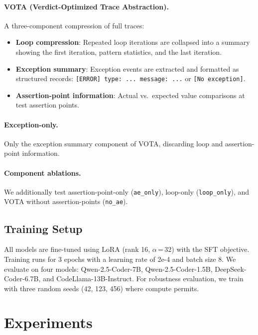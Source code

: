 \documentclass[11pt]{article}
\begin{document}
\paragraph{VOTA (Verdict-Optimized Trace Abstraction).} A three-component compression of full traces:
\begin{itemize}[nosep,leftmargin=*]
    \item \textbf{Loop compression}: Repeated loop iterations are collapsed into a summary showing the first iteration, pattern statistics, and the last iteration.
    \item \textbf{Exception summary}: Exception events are extracted and formatted as structured records: \texttt{[ERROR] type: ... message: ...} or \texttt{[No exception]}.
    \item \textbf{Assertion-point information}: Actual vs.\ expected value comparisons at test assertion points.
\end{itemize}

\paragraph{Exception-only.} Only the exception summary component of VOTA, discarding loop and assertion-point information.

\paragraph{Component ablations.} We additionally test assertion-point-only (\texttt{ae\_only}), loop-only (\texttt{loop\_only}), and VOTA without assertion-points (\texttt{no\_ae}).

\subsection{Training Setup}

All models are fine-tuned using LoRA (rank 16, $\alpha$\,=\,32) with the SFT objective. Training runs for 3 epochs with a learning rate of 2e-4 and batch size 8. We evaluate on four models: Qwen-2.5-Coder-7B, Qwen-2.5-Coder-1.5B, DeepSeek-Coder-6.7B, and CodeLlama-13B-Instruct. For robustness evaluation, we train with three random seeds (42, 123, 456) where compute permits.

\section{Experiments}
\label{sec:experiments}
\end{document}
